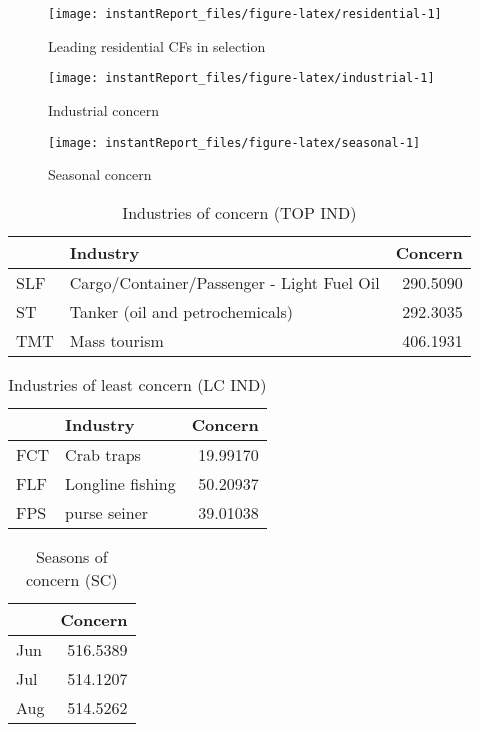 \documentclass[
]{article}
\begin{document}
\begin{figure}

{\centering \texttt{[image: instantReport\_files/figure-latex/residential-1]} 

}

\caption{Leading residential CFs in selection}\label{fig:residential}
\end{figure}

\begin{figure}

{\centering \texttt{[image: instantReport\_files/figure-latex/industrial-1]} 

}

\caption{Industrial concern}\label{fig:industrial}
\end{figure}

\begin{figure}

{\centering \texttt{[image: instantReport\_files/figure-latex/seasonal-1]} 

}

\caption{Seasonal concern}\label{fig:seasonal}
\end{figure}

\begin{table}

\caption{\label{tab:topind}Industries of concern (TOP IND)}
\centering
\begin{tabular}[t]{l|l|r}
\hline
  & Industry & Concern\\
\hline
SLF & Cargo/Container/Passenger - Light Fuel Oil & 290.5090\\
\hline
ST & Tanker (oil and petrochemicals) & 292.3035\\
\hline
TMT & Mass tourism & 406.1931\\
\hline
\end{tabular}
\end{table}

\begin{table}

\caption{\label{tab:lcind}Industries of least concern (LC IND)}
\centering
\begin{tabular}[t]{l|l|r}
\hline
  & Industry & Concern\\
\hline
FCT & Crab traps & 19.99170\\
\hline
FLF & Longline fishing & 50.20937\\
\hline
FPS & purse seiner & 39.01038\\
\hline
\end{tabular}
\end{table}

\begin{table}

\caption{\label{tab:scind}Seasons of concern (SC)}
\centering
\begin{tabular}[t]{l|r}
\hline
  & Concern\\
\hline
Jun & 516.5389\\
\hline
Jul & 514.1207\\
\hline
Aug & 514.5262\\
\hline
\end{tabular}
\end{table}
\end{document}
